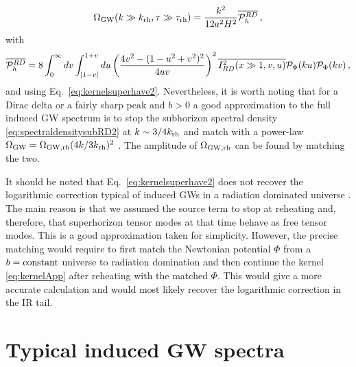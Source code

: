 \documentclass[a4paper,11pt]{article}
\numberwithin{equation}{section}
\begin{document}
\begin{equation}\label{eq:spectraldensitysuperRD}
\Omega_{\rm GW}(k\gg k_{\rm rh}, \tau\gg \tau_{\rm rh})=\frac{k^2}{12a^2H^2}\overline{{\cal P}^{RD}_{h}}\,,
\end{equation}
with
\begin{equation}\label{eq:PhgaussiansuperRD}
\overline{{\cal P}^{RD}_h}=8\int_0^\infty dv\int_{|1-v|}^{1+v}du\left(\frac{4v^2-(1-u^2+v^2)^2}{4uv}\right)^2\overline{I_{RD}^2(x\gg1,v,u)}{{\cal P}_{\Phi}(ku)}{{\cal P}_{\Phi}(kv)}\,,
\end{equation}
and using Eq.~\eqref{eq:kernelsuperhave2}. Nevertheless, it is worth noting that for a Dirac delta or a fairly sharp peak and $b>0$ a good approximation to the full induced GW spectrum is to stop the subhorizon spectral density \eqref{eq:spectraldensitysubRD2} at $k\sim 3/4 k_{\rm rh}$ and match with a power-law $\Omega_{\rm GW}=\Omega_{\rm GW,rh} (4k/3k_{\rm rh})^2$ \cite{Domenech:2020kqm}. The amplitude of $\Omega_{\rm GW,rh}$ can be found by matching the two.


It should be noted that Eq.~\eqref{eq:kernelsuperhave2} does not recover the logarithmic correction typical of induced GWs in a radiation dominated universe \cite{Yuan:2019wwo}. The main reason is that we assumed the source term to stop at reheating and, therefore, that superhorizon tensor modes at that time behave as free tensor modes. This is a good approximation taken for simplicity. However, the precise matching would require to first match the Newtonian potential $\Phi$ from a $b={\rm constant}$ universe to radiation domination and then continue the kernel \eqref{eq:kernelApp} after reheating with the matched $\Phi$. This would give a more accurate calculation and would most likely recover the logarithmic correction in the IR tail.




\section{Typical induced GW spectra \label{sec:typical}}
\end{document}
